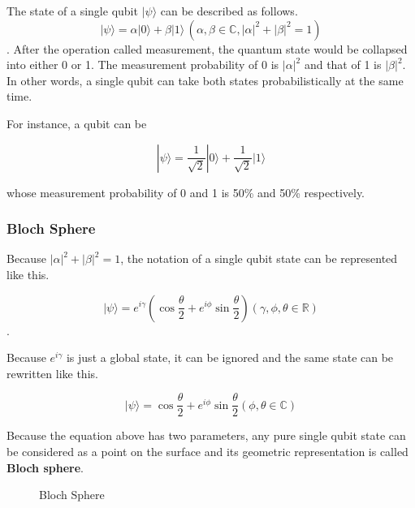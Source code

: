 The state of a single qubit $|\psi\rangle$ can be described as follows.
$$ |\psi\rangle = \alpha |0\rangle + \beta |1\rangle \,(\alpha, \beta \in \mathbb{C}, |\alpha|^2+|\beta|^2=1)$$.
 After the operation called measurement, the quantum state would be collapsed into either 0 or 1.  The measurement probability of 0 is $|\alpha|^2$ and that of 1 is $|\beta|^2$. In other words, a single qubit can take both states probabilistically at the same time.  
 
 For instance, a qubit can be 
 
 \begin{equation}
	|\psi\rangle = \frac{1}{\sqrt{2}}|0\rangle + \frac{1}{\sqrt{2}}|1\rangle \tag{1}
\end{equation}

 whose measurement probability of 0 and 1 is 50\% and 50\% respectively.

\subsubsection{Bloch Sphere}
Because $|\alpha|^2 + |\beta|^2 = 1$, the notation of a single qubit state can be represented like this.

\begin{equation}
|\psi\rangle = e^{i\gamma} (\cos{\frac{\theta}{2}} + e^{i\phi} \sin{\frac{\theta}{2}}) (\gamma, \phi, \theta \in \mathbb{R})
\end{equation}.

Because $e^{i\gamma}$ is just a global state, it can be ignored and the same state can be rewritten like this.

\begin{equation}
 |\psi\rangle =  \cos{\frac{\theta}{2}} + e^{i\phi} \sin{\frac{\theta}{2}} (\phi, \theta \in \mathbb{C})
\end{equation}

Because the equation above has two parameters,  any pure single qubit state can be considered as a point on the surface and its geometric representation is called \textbf{Bloch sphere}.

\begin{figure}[ht]
  \centering
    
\newpage
\caption{Bloch Sphere}
\end{figure}


